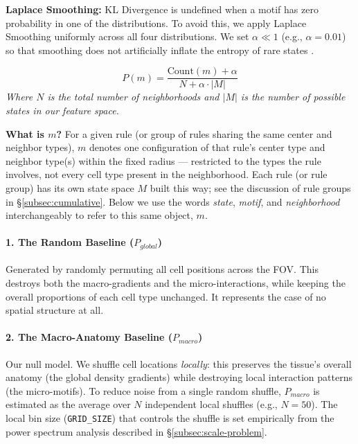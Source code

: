 \documentclass[10pt, a4paper]{article}
\begin{document}
\textbf{Laplace Smoothing:} KL Divergence is undefined when a motif has zero probability in one of the distributions. To avoid this, we apply Laplace Smoothing uniformly across all four distributions. We set $\alpha \ll 1$ (e.g., $\alpha = 0.01$) so that smoothing does not artificially inflate the entropy of rare states \cite[Lecture 4, p. 62]{Schumacher2015}.

\begin{equation}
P(m) = \frac{\text{Count}(m) + \alpha}{N + \alpha \cdot |M|}
\end{equation}
\textit{Where $N$ is the total number of neighborhoods and $|M|$ is the number of possible states in our feature space.}

\textbf{What is $m$?} For a given rule (or group of rules sharing the same center and neighbor types), $m$ denotes one configuration of that rule's center type and neighbor type(s) within the fixed radius — restricted to the types the rule involves, not every cell type present in the neighborhood. Each rule (or rule group) has its own state space $M$ built this way; see the discussion of rule groups in \S\ref{subsec:cumulative}. Below we use the words \textit{state}, \textit{motif}, and \textit{neighborhood} interchangeably to refer to this same object, $m$.

\paragraph{1. The Random Baseline ($P_{global}$)}
Generated by randomly permuting all cell positions across the FOV. This destroys both the macro-gradients and the micro-interactions, while keeping the overall proportions of each cell type unchanged. It represents the case of no spatial structure at all.

\paragraph{2. The Macro-Anatomy Baseline ($P_{macro}$)}
Our null model. We shuffle cell locations \textit{locally}: this preserves the tissue's overall anatomy (the global density gradients) while destroying local interaction patterns (the micro-motifs). To reduce noise from a single random shuffle, $P_{macro}$ is estimated as the average over $N$ independent local shuffles (e.g., $N = 50$). The local bin size (\texttt{GRID\_SIZE}) that controls the shuffle is set empirically from the power spectrum analysis described in \S\ref{subsec:scale-problem}.
\end{document}
